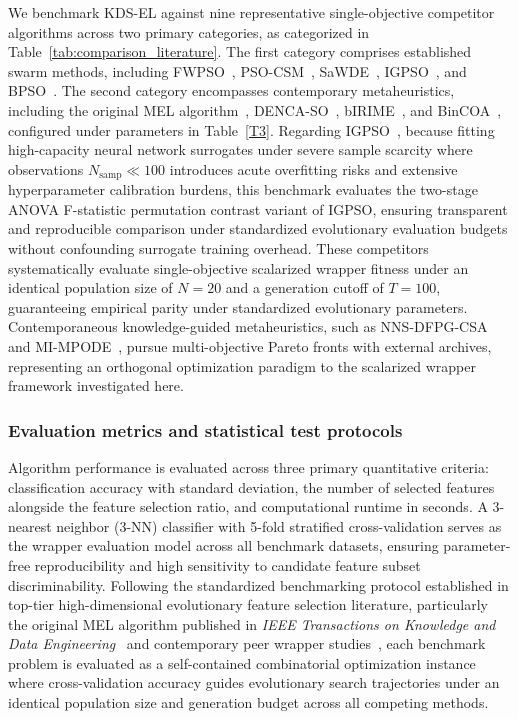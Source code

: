 We benchmark KDS-EL against nine representative single-objective competitor algorithms across two primary categories, as categorized in Table~\ref{tab:comparison_literature}. The first category comprises established swarm methods, including FWPSO~\cite{wangjia2022}, PSO-CSM~\cite{wei2025}, SaWDE~\cite{wang2022}, IGPSO~\cite{xuezhang2024}, and BPSO~\cite{kennedy1997}. The second category encompasses contemporary metaheuristics, including the original MEL algorithm~\cite{mel2024}, DENCA-SO~\cite{hancer2023}, bIRIME~\cite{su2024}, and BinCOA~\cite{shikoun2024}, configured under parameters in Table~\ref{T3}. Regarding IGPSO~\cite{xuezhang2024}, because fitting high-capacity neural network surrogates under severe sample scarcity where observations $N_{\mathrm{samp}} \ll 100$ introduces acute overfitting risks and extensive hyperparameter calibration burdens, this benchmark evaluates the two-stage ANOVA F-statistic permutation contrast variant of IGPSO, ensuring transparent and reproducible comparison under standardized evolutionary evaluation budgets without confounding surrogate training overhead. These competitors systematically evaluate single-objective scalarized wrapper fitness under an identical population size of $N = 20$ and a generation cutoff of $T = 100$, guaranteeing empirical parity under standardized evolutionary parameters. Contemporaneous knowledge-guided metaheuristics, such as NNS-DFPG-CSA~\cite{deng2025nns} and MI-MPODE~\cite{mimpode2025}, pursue multi-objective Pareto fronts with external archives, representing an orthogonal optimization paradigm to the scalarized wrapper framework investigated here.

\subsubsection{Evaluation metrics and statistical test protocols}

Algorithm performance is evaluated across three primary quantitative criteria: classification accuracy with standard deviation, the number of selected features alongside the feature selection ratio, and computational runtime in seconds. A 3-nearest neighbor (3-NN) classifier with 5-fold stratified cross-validation serves as the wrapper evaluation model across all benchmark datasets, ensuring parameter-free reproducibility and high sensitivity to candidate feature subset discriminability. Following the standardized benchmarking protocol established in top-tier high-dimensional evolutionary feature selection literature, particularly the original MEL algorithm published in \textit{IEEE Transactions on Knowledge and Data Engineering}~\cite{mel2024} and contemporary peer wrapper studies~\cite{wangjia2022,wei2025}, each benchmark problem is evaluated as a self-contained combinatorial optimization instance where cross-validation accuracy guides evolutionary search trajectories under an identical population size and generation budget across all competing methods.

